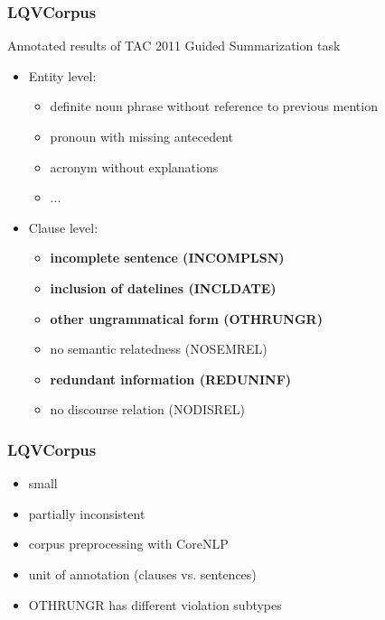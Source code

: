 \documentclass[table]{beamer}
\begin{document}
\begin{frame}
  \frametitle{LQVCorpus \citep{friedrichlqvsumm}}
  Annotated results of TAC 2011 Guided Summarization task \citep{owczarzak2011overview}
\pause
  \begin{itemize}
    \item Entity level:
    \begin{itemize}
      \item definite noun phrase without reference to previous mention%
      \item pronoun with missing antecedent%
      \item acronym without explanations%
      \item ...
    \end{itemize}\pause
    \item Clause level:
    \begin{itemize}
      \item \textbf{incomplete sentence (INCOMPLSN)}
      \item \textbf{inclusion of datelines (INCLDATE)}
      \item \textbf{other ungrammatical form (OTHRUNGR)}
      \item no semantic relatedness (NOSEMREL)
      \item \textbf{redundant information (REDUNINF)}
      \item no discourse relation (NODISREL)
    \end{itemize}
  \end{itemize}
\end{frame}

\begin{frame}
  \frametitle{LQVCorpus \citep{friedrichlqvsumm}}
  \begin{itemize}
    \item small %
    \item partially inconsistent\pause %
    \item corpus preprocessing with CoreNLP \citep{manning-EtAl:2014:P14-5}
    \item unit of annotation (clauses vs. sentences)\pause
    \item OTHRUNGR has different violation subtypes
  \end{itemize}
\end{frame}
\end{document}
